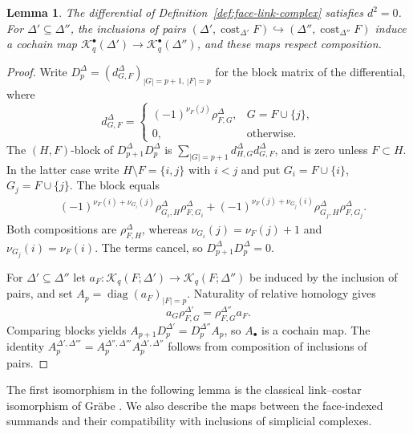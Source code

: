 \documentclass[11pt]{article}
\theoremstyle{plain}
\newtheorem{lemma}[theorem]{Lemma}
\theoremstyle{definition}
\newcommand{\cost}{\operatorname{cost}}
\newcommand{\Kc}{\mathcal K}
\begin{document}
\begin{lemma}\label{lem:face-link-differential}
The differential of Definition~\ref{def:face-link-complex} satisfies $d^2=0$. For $\Delta'\subseteq\Delta''$, the inclusions of pairs $(\Delta',\cost_{\Delta'}F)\hookrightarrow(\Delta'',\cost_{\Delta''}F)$ induce a cochain map $\Kc_q^\bullet(\Delta')\to\Kc_q^\bullet(\Delta'')$, and these maps respect composition.
\end{lemma}

\begin{proof}
Write $D_p^\Delta=(d_{G,F}^\Delta)_{|G|=p+1,\,|F|=p}$ for the block matrix of the differential, where
\[
d_{G,F}^\Delta=\begin{cases}
(-1)^{\nu_F(j)}\rho^\Delta_{F,G},&G=F\cup\{j\},\\
0,&\text{otherwise}.
\end{cases}
\]
The $(H,F)$-block of $D_{p+1}^\Delta D_p^\Delta$ is $\sum_{|G|=p+1}d_{H,G}^\Delta d_{G,F}^\Delta$, and is zero unless $F\subset H$. In the latter case write $H\setminus F=\{i,j\}$ with $i<j$ and put $G_i=F\cup\{i\}$, $G_j=F\cup\{j\}$. The block equals
\[
\begin{aligned}
&(-1)^{\nu_F(i)+\nu_{G_i}(j)}\rho^\Delta_{G_i,H}\rho^\Delta_{F,G_i}
+(-1)^{\nu_F(j)+\nu_{G_j}(i)}\rho^\Delta_{G_j,H}\rho^\Delta_{F,G_j}.
\end{aligned}
\]
Both compositions are $\rho^\Delta_{F,H}$, whereas $\nu_{G_i}(j)=\nu_F(j)+1$ and $\nu_{G_j}(i)=\nu_F(i)$. The terms cancel, so $D_{p+1}^\Delta D_p^\Delta=0$.

For $\Delta'\subseteq\Delta''$ let $a_F:\Kc_q(F;\Delta')\to\Kc_q(F;\Delta'')$ be induced by the inclusion of pairs, and set $A_p=\operatorname{diag}(a_F)_{|F|=p}$. Naturality of relative homology gives
\[
a_G\rho^{\Delta'}_{F,G}=\rho^{\Delta''}_{F,G}a_F.
\]
Comparing blocks yields $A_{p+1}D_p^{\Delta'}=D_p^{\Delta''}A_p$, so $A_\bullet$ is a cochain map. The identity $A_p^{\Delta',\Delta'''}=A_p^{\Delta'',\Delta'''}A_p^{\Delta',\Delta''}$ follows from composition of inclusions of pairs.
\end{proof}

The first isomorphism in the following lemma is the classical
link--costar isomorphism of Gr\"abe
\cite[\S 1.3]{Grabe1984}. We also describe the maps between
the face-indexed summands and their compatibility with
inclusions of simplicial complexes.
\end{document}
